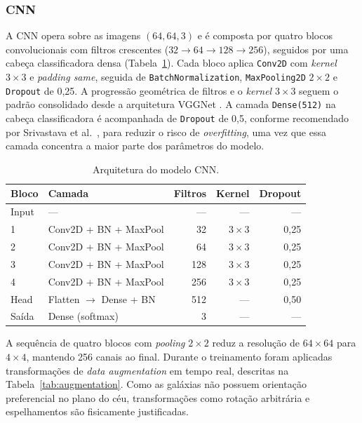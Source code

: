 \documentclass[12pt, a4paper]{article}
\begin{document}
\subsubsection{CNN}

A CNN opera sobre as imagens $(64, 64, 3)$ e é composta por quatro blocos
convolucionais com filtros crescentes ($32 \to 64 \to 128 \to 256$),
seguidos por uma cabeça classificadora densa
(Tabela~\ref{tab:cnn_arch}). Cada bloco aplica \texttt{Conv2D} com
\textit{kernel} $3 \times 3$ e \textit{padding same}, seguida de
\texttt{BatchNormalization}, \texttt{MaxPooling2D} $2 \times 2$ e
\texttt{Dropout} de 0,25. A progressão geométrica de filtros e o
\textit{kernel} $3 \times 3$ seguem o padrão consolidado desde a
arquitetura VGGNet \cite{simonyan2014}. A camada \texttt{Dense(512)} na
cabeça classificadora é acompanhada de \texttt{Dropout} de 0,5,
conforme recomendado por Srivastava et al.\ \cite{srivastava2014}, para
reduzir o risco de \textit{overfitting}, uma vez que essa camada concentra
a maior parte dos parâmetros do modelo.

\begin{table}[H]
  \centering
  \caption{Arquitetura do modelo CNN.}
  \label{tab:cnn_arch}
  \begin{tabular}{llrrr}
    \toprule
    \textbf{Bloco} & \textbf{Camada} & \textbf{Filtros} & \textbf{Kernel} & \textbf{Dropout} \\
    \midrule
    Input  & ---            & ---  & ---           & --- \\
    1      & Conv2D + BN + MaxPool & 32  & $3 \times 3$ & 0,25 \\
    2      & Conv2D + BN + MaxPool & 64  & $3 \times 3$ & 0,25 \\
    3      & Conv2D + BN + MaxPool & 128 & $3 \times 3$ & 0,25 \\
    4      & Conv2D + BN + MaxPool & 256 & $3 \times 3$ & 0,25 \\
    Head   & Flatten $\to$ Dense + BN & 512 & --- & 0,50 \\
    Saída  & Dense (softmax) & 3 & --- & --- \\
    \bottomrule
  \end{tabular}
\end{table}

A sequência de quatro blocos com \textit{pooling} $2 \times 2$ reduz a
resolução de $64 \times 64$ para $4 \times 4$, mantendo 256 canais ao
final. Durante o treinamento foram aplicadas transformações de
\textit{data augmentation} em tempo real, descritas na
Tabela~\ref{tab:augmentation}. Como as galáxias não possuem orientação
preferencial no plano do céu, transformações como rotação arbitrária e
espelhamentos são fisicamente justificadas.
\end{document}
